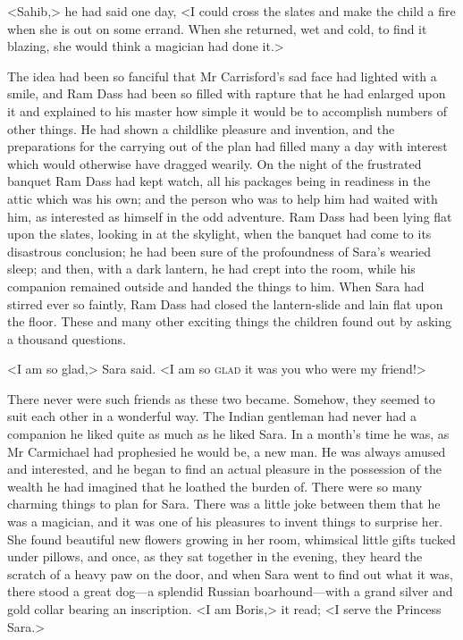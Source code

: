 <Sahib,> he had said one day, <I could cross the slates and make the child a fire when she is out on some errand. When she returned, wet and cold, to find it blazing, she would think a magician had done it.>

The idea had been so fanciful that Mr Carrisford's sad face had lighted with a smile, and Ram Dass had been so filled with rapture that he had enlarged upon it and explained to his master how simple it would be to accomplish numbers of other things. He had shown a childlike pleasure and invention, and the preparations for the carrying out of the plan had filled many a day with interest which would otherwise have dragged wearily. On the night of the frustrated banquet Ram Dass had kept watch, all his packages being in readiness in the attic which was his own; and the person who was to help him had waited with him, as interested as himself in the odd adventure. Ram Dass had been lying flat upon the slates, looking in at the skylight, when the banquet had come to its disastrous conclusion; he had been sure of the profoundness of Sara's wearied sleep; and then, with a dark lantern, he had crept into the room, while his companion remained outside and handed the things to him. When Sara had stirred ever so faintly, Ram Dass had closed the lantern-slide and lain flat upon the floor. These and many other exciting things the children found out by asking a thousand questions.

<I am so glad,> Sara said. <I am so \textsc{glad} it was you who were my friend!>

There never were such friends as these two became. Somehow, they seemed to suit each other in a wonderful way. The Indian gentleman had never had a companion he liked quite as much as he liked Sara. In a month's time he was, as Mr Carmichael had prophesied he would be, a new man. He was always amused and interested, and he began to find an actual pleasure in the possession of the wealth he had imagined that he loathed the burden of. There were so many charming things to plan for Sara. There was a little joke between them that he was a magician, and it was one of his pleasures to invent things to surprise her. She found beautiful new flowers growing in her room, whimsical little gifts tucked under pillows, and once, as they sat together in the evening, they heard the scratch of a heavy paw on the door, and when Sara went to find out what it was, there stood a great dog—a splendid Russian boarhound—with a grand silver and gold collar bearing an inscription. <I am Boris,> it read; <I serve the Princess Sara.>

